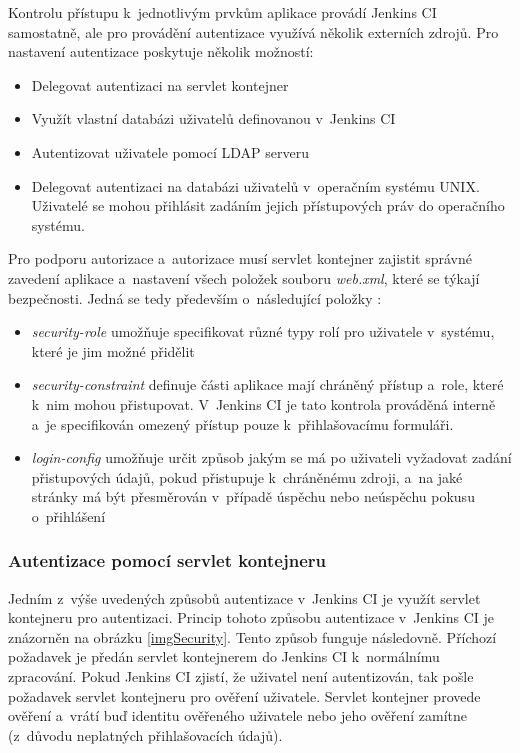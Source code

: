             Kontrolu přístupu k~jednotlivým prvkům aplikace provádí 
            Jenkins CI samostatně, ale pro provádění autentizace využívá několik externích zdrojů. Pro nastavení autentizace
            poskytuje několik možností:

            \begin{itemize}
                \item Delegovat autentizaci na servlet kontejner
                \item Využít vlastní databázi uživatelů definovanou v~Jenkins CI
                \item Autentizovat uživatele pomocí LDAP serveru
                \item Delegovat autentizaci na databázi uživatelů v~operačním systému UNIX. Uživatelé 
                    se mohou přihlásit zadáním jejich přístupových práv do operačního systému. 
            \end{itemize}
            
            Pro podporu autorizace a~autorizace musí servlet kontejner zajistit správné zavedení aplikace a~nastavení
            všech položek souboru \emph{web.xml}, které se týkají bezpečnosti. Jedná se tedy především
            o~následující položky \cite{webXml}:

            \begin{itemize}
                \item \emph{security-role} umožňuje specifikovat různé typy rolí pro uživatele v~systému,
                    které je jim možné přidělit
                \item \emph{security-constraint} definuje části aplikace mají chráněný přístup a~role, které k~nim
                    mohou přistupovat. V~Jenkins CI je tato kontrola prováděná interně a~je specifikován
                    omezený přístup pouze k~přihlašovacímu formuláři.
                \item \emph{login-config} umožňuje určit způsob jakým se má po uživateli vyžadovat zadání přistupových
                    údajů, pokud přistupuje k~chráněnému zdroji, a~na jaké stránky má být přesměrován v~případě úspěchu
                    nebo neúspěchu pokusu o~přihlášení
            \end{itemize}
            
    
            \subsubsection{Autentizace pomocí servlet kontejneru}
                Jedním z~výše uvedených způsobů autentizace v~Jenkins CI je využít servlet kontejneru pro autentizaci.
                Princip tohoto způsobu autentizace v~Jenkins CI je znázorněn na obrázku \ref{imgSecurity}. 
                Tento způsob funguje následovně. Příchozí 
                požadavek je předán servlet kontejnerem do Jenkins CI k~normálnímu zpracování. 
                Pokud Jenkins CI zjistí, že uživatel
                není autentizován, tak pošle požadavek servlet kontejneru pro ověření uživatele. Servlet
                kontejner provede ověření a~vrátí buď identitu ověřeného uživatele nebo jeho ověření zamítne (z~důvodu
                neplatných přihlašovacích údajů).
                
